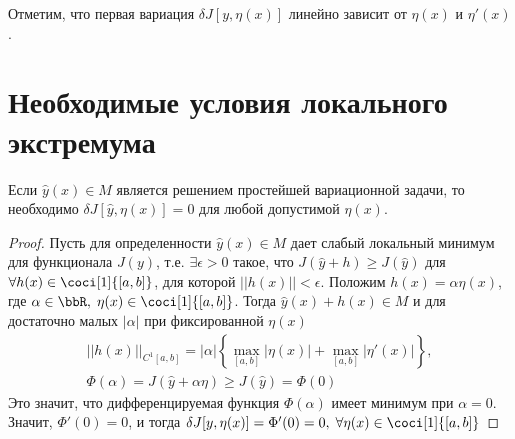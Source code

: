 Отметим, что первая вариация $\delta J[y,\eta(x)]$ линейно зависит от $\eta(x)$ и $\eta'(x)$.

\section{Необходимые условия локального экстремума}
\begin{thm} \label{ch29thm1}
Если $\hat{y}(x)\in M$ является решением простейшей вариационной задачи, то необходимо $\delta J[\hat{y},\eta (x)]=0$ для любой допустимой $\eta (x)$.
\end{thm}

\begin{proof}
Пусть для определенности $\hat{y}(x)\in M$ дает слабый локальный минимум для функционала $J(y)$, т.е. $\exists\epsilon>0$ такое, что $J(\hat{y}+h)\geq J(\hat{y})$ для $\forall h(x)\in \coci[1]{[a,b]}$, для которой $||h(x)||<\epsilon$. Положим $h(x)=\alpha\eta(x)$, где $\alpha\in \bbR,\;\eta(x)\in \coci[1]{[a,b]}$. Тогда $\hat{y}(x)+h(x)\in M$ и для достаточно малых $|\alpha|$ при фиксированной $\eta(x)$
\begin{gather}
||h(x)||_{C^1[a,b]}=|\alpha|\left\{\max_{[a,b]}\limits |\eta(x)|+\max_{[a,b]}\limits |\eta'(x)|\right\},\\
\Phi(\alpha)=J(\hat{y}+\alpha\eta)\geq J(\hat{y})=\Phi(0)
\end{gather}
Это значит, что дифференцируемая функция $\Phi(\alpha)$ имеет минимум при $\alpha=0$. Значит, $\Phi ' (0)=0$, и тогда $\delta J[y,\eta(x)]=\Phi ' (0)=0,\; \forall \eta(x)\in \coci[1]{[a,b]}$
\end{proof}

